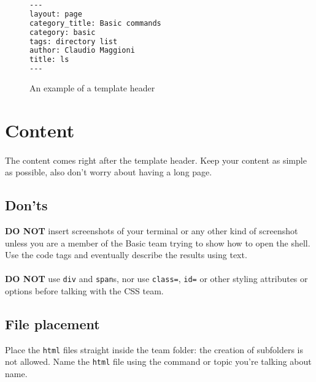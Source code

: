 \documentclass[hidelinks,12pt,a4paper,numbers=enddot]{scrartcl}
\begin{document}
\begin{figure}[h]
\begin{lstlisting}[language=html]
---
layout: page
category_title: Basic commands
category: basic
tags: directory list
author: Claudio Maggioni
title: ls
---
\end{lstlisting}
\caption{An example of a template header}
\end{figure}

\section{Content}

\paragraph{}
The content comes right after the template header.
Keep your content as simple as possible, also don't worry about having a long page.

\subsection{Don'ts}
\textbf{DO NOT} insert screenshots of your terminal or any other kind of screenshot
unless you are a member of the Basic team trying to show how to open the shell. Use
the code tags and eventually describe the results using text.

\paragraph{}
\textbf{DO NOT} use \texttt{div} and \texttt{span}s, nor use \texttt{class=}, \texttt{id=}
or other styling attributes or options before talking with the CSS team. 

\subsection{File placement}
Place the \texttt{html} files straight inside the team folder: the creation of subfolders is not
allowed. Name the \texttt{html} file using the command or topic you're talking about name.
\end{document}
